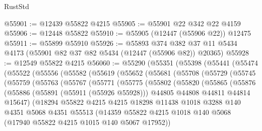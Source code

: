\begin{lexlean}{RustStd}
\begin{coremodule}
@55901 := @12439 @55822 @4215
@55905 := @55901 @22 @342 @22 @4159
@55906 := @12448 @55822
@55910 := @55905 (@12447 (@55906 @22)) @12475
@55911 := @55899 @55910
@55926 := @55893
    @374
    @382
    @37
    @11
    @5434
    @4173
    (@55901 @82 @37 @82 @5434 (@12447 (@55906 @82)) @20365)
@55928 := @12549 @55822 @4215
@56060 := @55290
    (@55351
      (@55398
        (@55441
          (@55474
            (@55522
              (@55556
                (@55582
                  (@55619
                    (@55652
                      (@55681
                        (@55708
                          (@55729
                            (@55745
                              (@55759
                                (@55763
                                  (@55767
                                    (@55771
                                      (@55775
                                        (@55802
                                          (@55820
                                            (@55865
                                              (@55876
                                                (@55886
                                                  (@55891 (@55911 (@55926 @55928)))
                                                  @44805
                                                  @44808
                                                  @44811
                                                  @44814
                                                  @15647)
                                                (@18294
                                                  @55822
                                                  @4215
                                                  @4215
                                                  @18298
                                                  @11438
                                                  @1018
                                                  @3288
                                                  @140
                                                  @4351
                                                  @5068
                                                  @4351
                                                  @55513
                                                  (@14359
                                                    @55822
                                                    @4215
                                                    @1018
                                                    @140
                                                    @5068
                                                    (@17940 @55822 @4215 @1015 @140 @5067 @17952))

\end{coremodule}
\end{lexlean}
